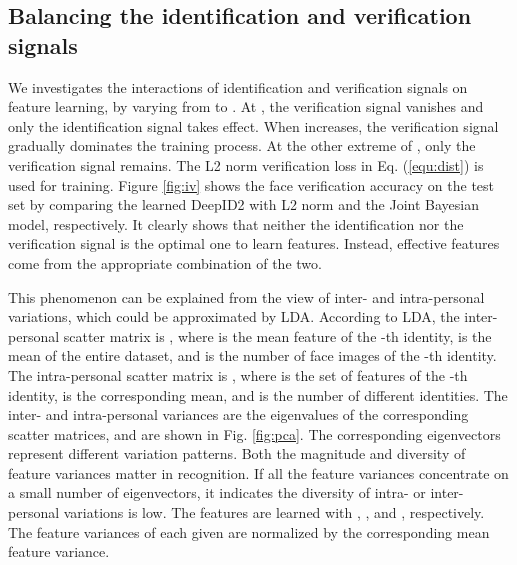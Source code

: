 \documentclass{article} \usepackage{nips14submit_e,times}
\begin{document}
\subsection{Balancing the identification and verification signals}
\label{ssec:idve}

We investigates the interactions of identification and verification signals on feature learning, by varying  from  to . At , the verification signal vanishes  and only the identification signal takes effect. When  increases, the verification signal gradually dominates the training process. At the other extreme of , only the verification signal remains. The L2 norm verification loss in Eq. (\ref{equ:dist}) is used for training. Figure \ref{fig:iv} shows the face verification accuracy on the test set by comparing the learned DeepID2 with L2 norm and the Joint Bayesian model, respectively. It clearly shows that neither the identification nor the verification signal is the optimal one to learn features. Instead, effective features come from the appropriate combination of the two.

This phenomenon can be explained from the view of inter- and intra-personal variations, which could be approximated by LDA.
According to LDA, the inter-personal scatter matrix is , where  is the mean feature of the -th identity,  is the mean of the entire dataset, and  is the number of face images of the -th identity. The intra-personal scatter matrix is , where  is the set of features of the -th identity,  is the corresponding mean, and  is the number of different identities. The inter- and intra-personal variances are the eigenvalues of the corresponding scatter matrices, and are shown in Fig. \ref{fig:pca}. The corresponding eigenvectors represent different variation patterns.
Both the magnitude and diversity of feature variances matter in recognition. If all the feature variances concentrate on a small number of eigenvectors, it indicates the diversity of intra- or inter-personal variations is low.
The features are learned with , , and , respectively.
The feature variances of each given  are normalized by the corresponding mean feature variance.
\end{document}
